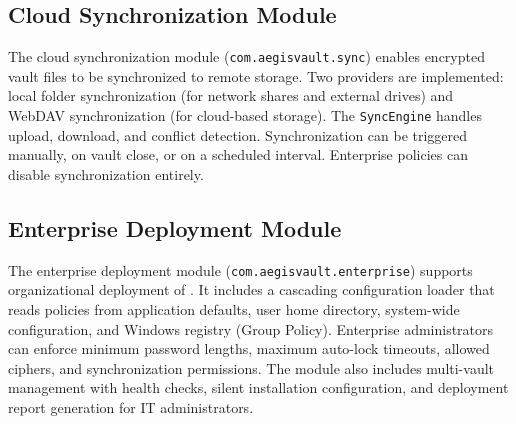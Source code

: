 \subsection{Cloud Synchronization Module}
The cloud synchronization module (\texttt{com.aegisvault.sync}) enables encrypted vault files to be synchronized to remote storage. Two providers are implemented: local folder synchronization (for network shares and external drives) and WebDAV synchronization (for cloud-based storage). The \texttt{SyncEngine} handles upload, download, and conflict detection. Synchronization can be triggered manually, on vault close, or on a scheduled interval. Enterprise policies can disable synchronization entirely.

\subsection{Enterprise Deployment Module}
The enterprise deployment module (\texttt{com.aegisvault.enterprise}) supports organizational deployment of \projname{}. It includes a cascading configuration loader that reads policies from application defaults, user home directory, system-wide configuration, and Windows registry (Group Policy). Enterprise administrators can enforce minimum password lengths, maximum auto-lock timeouts, allowed ciphers, and synchronization permissions. The module also includes multi-vault management with health checks, silent installation configuration, and deployment report generation for IT administrators.
